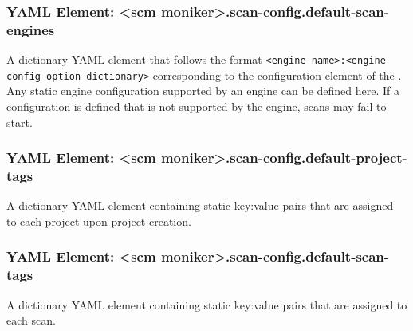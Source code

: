 \subsubsection{YAML Element: <scm moniker>.scan-config.default-scan-engines}\label{sec:yaml-scan-config-default-scan-engines}

A dictionary YAML element that follows the format \texttt{<engine-name>:<engine config option dictionary>}
corresponding to the configuration element of the
.
Any static engine configuration supported by an engine can be defined here.  If a configuration is defined that is not supported
by the engine, scans may fail to start.

\subsubsection{YAML Element: <scm moniker>.scan-config.default-project-tags}\label{sec:yaml-scan-config-default-project-tags}
A dictionary YAML element containing static key:value pairs that are assigned\\to each project upon project creation.

\subsubsection{YAML Element: <scm moniker>.scan-config.default-scan-tags}\label{sec:yaml-scan-config-default-scan-tags}
A dictionary YAML element containing static key:value pairs that are assigned to each scan.


